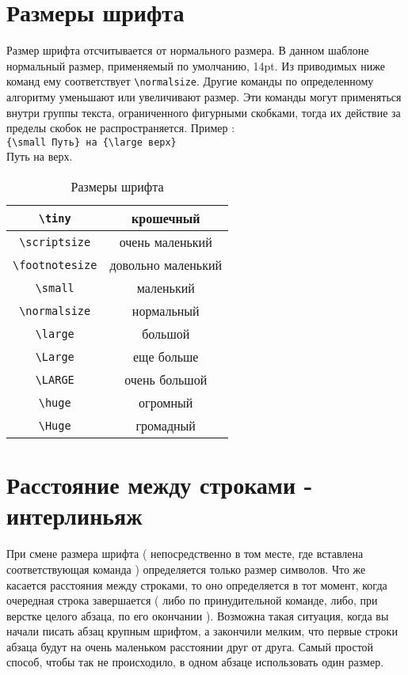 \section{Размеры шрифта}

Размер шрифта отсчитывается от нормального размера. В данном шаблоне нормальный размер, применяемый по умолчанию, 14pt. Из приводимых ниже команд ему соответствует \verb|\normalsize|. Другие команды по определенному алгоритму уменьшают или увеличивают размер. Эти команды могут применяться внутри группы текста, ограниченного фигурными скобками, тогда их действие за пределы скобок не распространяется. Пример :\\
\verb|{\small Путь} на {\large верх}|\\
{\small Путь} на {\large верх}.\\

\begin{table}[h!]
    \caption{Размеры шрифта}
    \centering
        \begin{tabular}{|c|c|}
        \hline  \verb|\tiny|      & \tiny        крошечный \\
        \hline  \verb|\scriptsize|   & \scriptsize  очень маленький\\
            \hline \verb|\footnotesize| & \footnotesize  довольно маленький \\
            \hline \verb|\small|        &  \small        маленький \\
            \hline \verb|\normalsize|   &  \normalsize  нормальный \\
            \hline \verb|\large|        &  \large       большой \\
            \hline \verb|\Large|        &  \Large       еще больше \\[5pt]
            \hline \verb|\LARGE|        &  \LARGE       очень большой \\[5pt]
            \hline \verb|\huge|         &  \huge        огромный \\[5pt]
            \hline \verb|\Huge|         &  \Huge        громадный \\ \hline
        \end{tabular}
\end{table}

\section{Расстояние между строками - интерлиньяж}

При смене размера шрифта ( непосредственно в том месте, где вставлена соответствующая команда ) определяется только размер символов. Что же касается расстояния между строками, то оно определяется в тот момент, когда очередная строка завершается ( либо по принудительной команде, либо, при верстке целого абзаца, по его окончании ). Возможна такая ситуация, когда вы начали писать абзац крупным шрифтом, а закончили мелким, что первые строки абзаца будут на очень маленьком расстоянии друг от друга. Самый простой способ, чтобы так не происходило, в одном абзаце использовать один размер.


